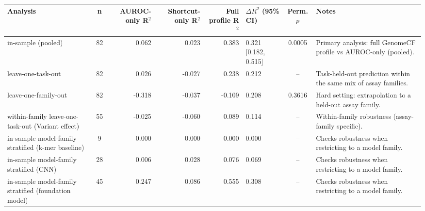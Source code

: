 \begin{tabular}{p{4.0cm}c r r r p{2.7cm} c p{4.1cm}}
\toprule
Analysis & n & AUROC-only R$^2$ & Shortcut-only R$^2$ & Full profile R$^2$ & $\Delta R^2$ (95\% CI) & Perm. $p$ & Notes \\
\midrule
in-sample (pooled) & 82 & 0.062 & 0.023 & 0.383 & 0.321 [0.182, 0.515] & 0.0005 & Primary analysis: full GenomeCF profile vs AUROC-only (pooled). \\
leave-one-task-out & 82 & 0.026 & -0.027 & 0.238 & 0.212 & -- & Task-held-out prediction within the same mix of assay families. \\
leave-one-family-out & 82 & -0.318 & -0.037 & -0.109 & 0.208 & 0.3616 & Hard setting: extrapolation to a held-out assay family. \\
within-family leave-one-task-out (Variant effect) & 55 & -0.025 & -0.060 & 0.089 & 0.114 & -- & Within-family robustness (assay-family specific). \\
in-sample model-family stratified (k-mer baseline) & 9 & 0.000 & 0.000 & 0.000 & 0.000 & -- & Checks robustness when restricting to a model family. \\
in-sample model-family stratified (CNN) & 28 & 0.006 & 0.028 & 0.076 & 0.069 & -- & Checks robustness when restricting to a model family. \\
in-sample model-family stratified (foundation model) & 45 & 0.247 & 0.086 & 0.555 & 0.308 & -- & Checks robustness when restricting to a model family. \\
\bottomrule
\end{tabular}
